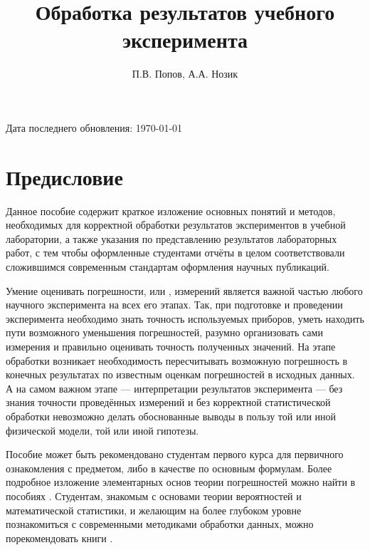 \documentclass[a5paper,10pt,oneside]{report}
\begin{document}
\title{Обработка результатов учебного эксперимента}
\author{П.В. Попов, А.А. Нозик}

\maketitle


Дата последнего обновления: \today


\tableofcontents

\listoftodos

\chapter*{Предисловие}
    Данное пособие содержит краткое изложение основных понятий и методов,
    необходимых для корректной обработки результатов экспериментов в учебной
    лаборатории, а также указания по представлению результатов лабораторных
    работ, с тем чтобы оформленные студентами отчёты в целом соответствовали
    сложившимся современным стандартам оформления научных публикаций.

    Умение оценивать погрешности, или , измерений
    является важной частью любого научного эксперимента на всех его этапах.
    Так, при подготовке и проведении эксперимента необходимо знать точность
    используемых приборов, уметь находить пути возможного уменьшения погрешностей,
    разумно организовать сами измерения и правильно оценивать точность
    полученных значений. На этапе обработки возникает необходимость пересчитывать
    возможную погрешность в конечных результатах по известным оценкам погрешностей
    в исходных данных. А на самом важном этапе --- интерпретации
    результатов эксперимента --- без знания точности проведённых
    измерений и без корректной статистической обработки невозможно делать
    обоснованные выводы в пользу той или иной физической модели, той или
    иной гипотезы.

    Пособие может быть рекомендовано студентам первого курса для первичного
    ознакомления с предметом, либо в качестве 
    по основным формулам. Более подробное
    изложение элементарных основ теории погрешностей можно найти в пособиях \cite{taylor,squires,zaidel}. 
    Студентам, знакомым с основами теории вероятностей и математической 
    статистики, и желающим на более глубоком уровне познакомиться с современными методиками обработки данных, можно порекомендовать книги \cite{hudson,idie}.
\end{document}
